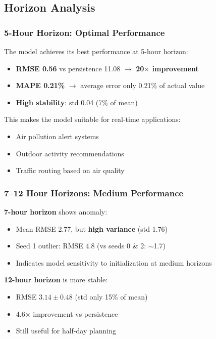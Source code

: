 \documentclass[11pt,a4paper]{article}
\begin{document}
\subsection{Horizon Analysis}

\subsubsection{5-Hour Horizon: Optimal Performance}

The model achieves its best performance at 5-hour horizon:
\begin{itemize}
    \item \textbf{RMSE 0.56} vs persistence 11.08 $\rightarrow$ \textbf{20$\times$ improvement}
    \item \textbf{MAPE 0.21\%} $\rightarrow$ average error only 0.21\% of actual value
    \item \textbf{High stability}: std 0.04 (7\% of mean)
\end{itemize}

This makes the model suitable for real-time applications:
\begin{itemize}
    \item Air pollution alert systems
    \item Outdoor activity recommendations
    \item Traffic routing based on air quality
\end{itemize}

\subsubsection{7--12 Hour Horizons: Medium Performance}

\textbf{7-hour horizon} shows anomaly:
\begin{itemize}
    \item Mean RMSE 2.77, but \textbf{high variance} (std 1.76)
    \item Seed 1 outlier: RMSE 4.8 (vs seeds 0 \& 2: $\sim$1.7)
    \item Indicates model sensitivity to initialization at medium horizons
\end{itemize}

\textbf{12-hour horizon} is more stable:
\begin{itemize}
    \item RMSE $3.14 \pm 0.48$ (std only 15\% of mean)
    \item 4.6$\times$ improvement vs persistence
    \item Still useful for half-day planning
\end{itemize}
\end{document}
